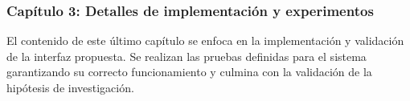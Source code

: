 
\subsubsection*{Capítulo 3: Detalles de implementación y experimentos}

El contenido de este último capítulo se enfoca en la implementación y validación de la interfaz propuesta. Se realizan las pruebas definidas para el sistema garantizando su correcto funcionamiento y culmina con la validación de la hipótesis de investigación.




%
%
%

